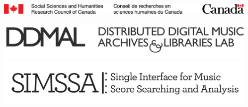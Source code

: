 \documentclass[final]{beamer}
\begin{document}
\begin{frame}[fragile,t]
\begin{minipage}[t][.8\textheight]{\textwidth}
\begin{columns}
\begin{column}{0.95\textwidth}
\begin{block}{}
\begin{columns}
\begin{column}{0.47\textwidth}
\begin{block}{}
                \includegraphics[scale=1.4]{images/SSHRC_logo}
                \vspace{0.8cm}

                \includegraphics[scale=0.3]{images/ddmal_logo_large}
                \hspace{1.3cm}
                \includegraphics[scale=0.9]{images/SIMSSA_logo}
            \end{block}
        \end{column}
        \end{columns}
        \end{block}

    \end{column}

\begin{column}{0.00\textwidth}
\end{column}
\end{columns}
\end{minipage}
\end{frame}
\end{document}
